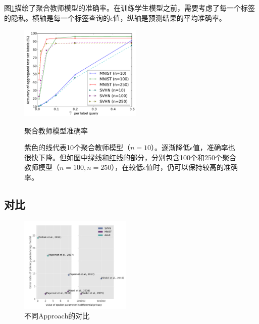 \documentclass[a4paper]{article}
\begin{document}
图\ref{fig:teacher-accuracy}描绘了聚合教师模型的准确率。在训练学生模型之前，需要考虑了每一个标签的隐私。横轴是每一个标签查询的$\epsilon$值，纵轴是预测结果的平均准确率。
\begin{figure}[!ht]
\includegraphics[width = 2.3in]{fig/lap-scale-accuracy.pdf}
\caption{聚合教师模型准确率}
\label{fig:teacher-accuracy}
\caption{紫色的线代表10个聚合教师模型（$n=10$）。逐渐降低$\epsilon$值，准确率也很快下降。但如图中绿线和红线的部分，分别包含100个和250个聚合教师模型（$n=100, n=250$），在较低$\epsilon$值时，仍可以保持较高的准确率。}
\end{figure}



\subsection{对比}

\begin{figure}[!ht]
\includegraphics[width = 2.1in]{fig/approach-comparison.png}
\caption{不同Approach的对比}
\end{figure}

\newpage



\end{document}
